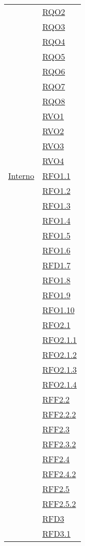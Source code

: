 \begin{longtable}{|>{\centering}m{5cm}|m{5cm}<{\centering}|}
& \hyperlink{RQO2}{RQO2}\\
& \hyperlink{RQO3}{RQO3}\\
& \hyperlink{RQO4}{RQO4}\\
& \hyperlink{RQO5}{RQO5}\\
& \hyperlink{RQO6}{RQO6}\\
& \hyperlink{RQO7}{RQO7}\\
& \hyperlink{RQO8}{RQO8}\\
& \hyperlink{RVO1}{RVO1}\\
& \hyperlink{RVO2}{RVO2}\\
& \hyperlink{RVO3}{RVO3}\\
& \hyperlink{RVO4}{RVO4}\\

\hline
\hyperlink{Interno}{Interno} 
& \hyperlink{RFO1.1}{RFO1.1}\\
& \hyperlink{RFO1.2}{RFO1.2}\\
& \hyperlink{RFO1.3}{RFO1.3}\\
& \hyperlink{RFO1.4}{RFO1.4}\\
& \hyperlink{RFO1.5}{RFO1.5}\\
& \hyperlink{RFO1.6}{RFO1.6}\\
& \hyperlink{RFD1.7}{RFD1.7}\\
& \hyperlink{RFO1.8}{RFO1.8}\\
& \hyperlink{RFO1.9}{RFO1.9}\\
& \hyperlink{RFO1.10}{RFO1.10}\\
& \hyperlink{RFO2.1}{RFO2.1}\\
& \hyperlink{RFO2.1.1}{RFO2.1.1}\\
& \hyperlink{RFO2.1.2}{RFO2.1.2}\\
& \hyperlink{RFO2.1.3}{RFO2.1.3}\\
& \hyperlink{RFO2.1.4}{RFO2.1.4}\\
& \hyperlink{RFF2.2}{RFF2.2}\\
& \hyperlink{RFF2.2.2}{RFF2.2.2}\\
& \hyperlink{RFF2.3}{RFF2.3}\\
& \hyperlink{RFF2.3.2}{RFF2.3.2}\\
& \hyperlink{RFF2.4}{RFF2.4}\\
& \hyperlink{RFF2.4.2}{RFF2.4.2}\\
& \hyperlink{RFF2.5}{RFF2.5}\\
& \hyperlink{RFF2.5.2}{RFF2.5.2}\\
& \hyperlink{RFD3}{RFD3}\\
& \hyperlink{RFD3.1}{RFD3.1}\\

\end{longtable}
